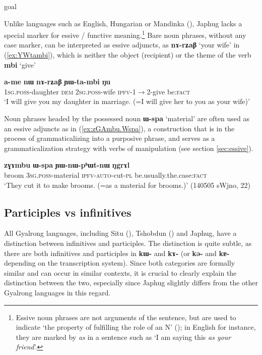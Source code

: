 \documentclass[oneside,a4paper,11pt]{article}
\newcommand{\ipa}[1]{\textbf{\phon#1}} %
\newcommand{\jpg}[2]{\ipa{#1} `#2'} %
\begin{document}
goal


Unlike languages such as English, Hungarian or Mandinka (\citealt{creissels14functive}), Japhug lacks a special marker for essive / functive meaning.\footnote{Essive noun phrases are not arguments of the sentence, but are used to indicate `the property of fulfilling the role of an N' (\citealt[606]{creissels14functive}); in English for instance, they are marked by \textit{as} in a sentence such as `I am saying this \textit{as your friend}'.} Bare noun phrases, without any case marker, can be interpreted as essive adjuncts, as \ipa{nɤ-rʑaβ} `your wife' in (\ref{ex:YWtambi}), which is neither the object (recipient) or the theme of the verb \jpg{mbi}{give}

\begin{exe}
\ex \label{ex:YWtambi}
\gll \ipa{a-me} 	\ipa{nɯ} 	\ipa{nɤ-rʑaβ} 	\ipa{ɲɯ-ta-mbi} 	\ipa{ŋu} \\
\textsc{1sg.poss}-daughter \textsc{dem} \textsc{2sg.poss}-wife \textsc{ipfv}-1$\rightarrow$2-give be:\textsc{fact} \\
\glt `I will give you my daughter in marriage. (=I will give her to you as your wife)'
\end{exe}

Noun phrases headed by the possessed noun \jpg{ɯ-spa}{material} are often used as an essive adjuncts as in (\ref{ex:zGAmbu.Wspa}), a construction that is in the process of grammaticalizing into a purposive phrase, and serves as a grammaticalization strategy with verbs of manipulation (see section \ref{sec:essive}).

\begin{exe}
\ex \label{ex:zGAmbu.Wspa}
\gll \ipa{zɣɤmbu} 	\ipa{ɯ-spa} 	\ipa{ɲɯ-nɯ-pʰɯt-nɯ} 	\ipa{ŋgrɤl} \\
broom \textsc{3sg.poss}-material \textsc{ipfv-auto}-cut-\textsc{pl} be.usually.the.case:\textsc{fact} \\
\glt `They cut it to make brooms. (=as a material for brooms.)' (140505 sWjno, 22)
\end{exe}

\subsection{Participles vs infinitives} \label{sec:part.inf}
All Gyalrong languages, including Situ (\citealt{youjing03zhuokeji}), Tshobdun (\citealt{sun12complementation}) and Japhug, have a distinction between infinitives and participles. The distinction is quite subtle, as there are both infinitives and participles in \ipa{kɯ-} and \ipa{kɤ-} (or \ipa{kə-} and \ipa{kɐ-} depending on the transcription system). Since both categories are formally similar and can occur in similar contexts, it is crucial to clearly explain the distinction between the two, especially since Japhug slightly differs from the other Gyalrong languages in this regard.
\end{document}
